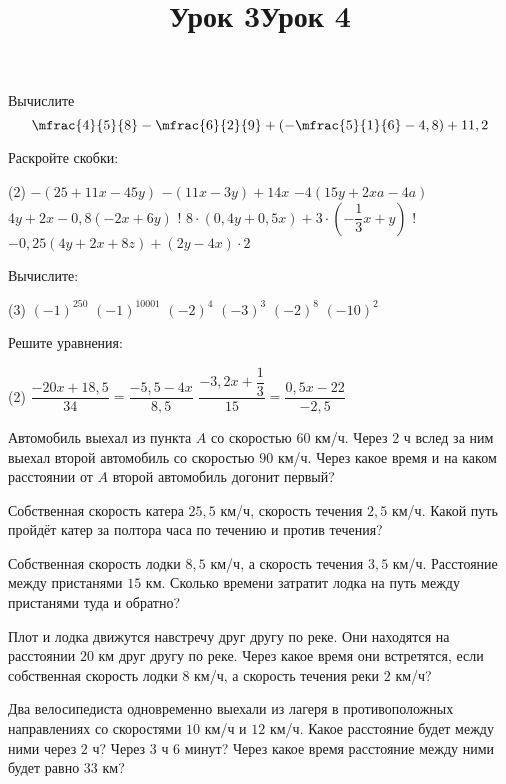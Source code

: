 \begin{class}[number=3-4]
	\title{Урок 3}
	\begin{listofex}
		\item Вычислите \[ \mfrac{4}{ 5 }{ 8 } - \mfrac{ 6 }{ 2 }{9} + \left( -\mfrac{ 5 }{ 1 }{6} - 4,8 \right)+11,2 \]
		\item Раскройте скобки:
		\begin{tasks}(2)
			\task \( -(25+11x-45y) \)
			\task \( -(11x-3y)+14x \)
			\task \( -4(15y+2xa-4a) \)
			\task \( 4y+2x-0,8(-2x+6y) \)
			\task! \( 8 \cdot (0,4y+0,5x)+3 \cdot \left( -\dfrac{ 1 }{ 3 }x + y \right) \)
			\task! \( -0,25(4y+2x+8z)+(2y-4x)\cdot 2 \)
		\end{tasks}
		
		\item Вычислите:
		\begin{tasks}(3)
			\task \( (-1)^{250} \)
			\task \( (-1)^{10001} \)
			\task \( (-2)^{4} \)
			\task \( (-3)^3 \)
			\task \( (-2)^8 \)
			\task \( (-10)^2 \)
		\end{tasks}
		\item Решите уравнения:
		\begin{tasks}(2)
			\task \( \dfrac{ -20x+18,5 }{ 34 }=\dfrac{ -5,5-4x }{ 8,5 } \)
			\task \( \dfrac{ -3,2x+\dfrac{ 1 }{ 3 } }{ 15 }=\dfrac{ 0,5x-22 }{ -2,5 } \)
		\end{tasks}
		
	\end{listofex}
	\newpage
	\title{Урок 4}
	\begin{listofex}
		\item Автомобиль выехал из пункта \(A\) со скоростью \(60\) км/ч. Через \(2\) ч вслед за ним выехал второй автомобиль со скоростью \(90\) км/ч. Через какое время и на каком расстоянии от \(A\) второй автомобиль догонит первый?
		\item Собственная скорость катера \(25,5\) км/ч, скорость течения \(2,5\) км/ч. Какой путь пройдёт катер за полтора часа по течению и против течения?
		\item Собственная скорость лодки \(8,5\) км/ч, а скорость течения \(3,5\) км/ч. Расстояние между пристанями \(15\) км. Сколько времени затратит лодка на путь между пристанями туда и обратно?
		\item Плот и лодка движутся навстречу друг другу по реке. Они находятся на расстоянии \(20\) км друг другу по реке. Через какое время они встретятся, если собственная скорость лодки \(8\) км/ч, а скорость течения реки \(2\) км/ч?
		\item Два велосипедиста одновременно выехали из лагеря в противоположных направлениях со скоростями \(10\) км/ч и \(12\) км/ч. Какое расстояние будет между ними через \(2\) ч? Через \(3\) ч \(6\) минут? Через какое время расстояние между ними будет равно \(33\) км?
	\end{listofex}
\end{class}

